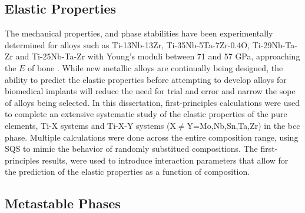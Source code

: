 \subsection{Elastic Properties}

The mechanical properties, and phase stabilities have been experimentally determined for alloys such as Ti-13Nb-13Zr, Ti-35Nb-5Ta-7Zr-0.4O, Ti-29Nb-Ta-Zr and Ti-25Nb-Ta-Zr with Young's moduli between 71 and 57 GPa, approaching the $E$ of bone \cite{Long1998a,Tane2008a,Tane2010a}. While new metallic alloys are continually being designed, the ability to predict the elastic properties before attempting to develop alloys for biomedical implants will reduce the need for trial and error and narrow the sope of alloys being selected. In this dissertation, first-principles calculations were used to complete an extensive systematic study of the elastic properties of the pure elements, Ti-X systems and Ti-X-Y systems (X$\neq$Y=Mo,Nb,Sn,Ta,Zr) in the bcc phase. Multiple calculations were done across the entire composition range, using SQS to mimic the behavior of randomly substitued compositions. The first-principles results, were used to introduce interaction parameters that allow for the prediction of the elastic properties as a function of composition.

\subsection{Metastable Phases}

